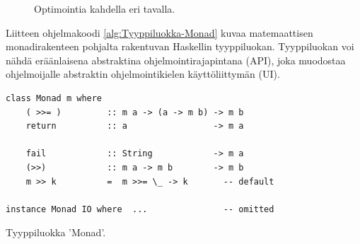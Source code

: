 \begin{figure}[tbh]
\caption{Optimointia kahdella eri tavalla.\label{fig:Optimointia-kahdella-eri}}

\end{figure}




Liitteen ohjelmakoodi \ref{alg:Tyyppiluokka-Monad} kuvaa matemaattisen
monadirakenteen pohjalta rakentuvan Haskellin tyyppiluokan. Tyyppiluokan
voi nähdä eräänlaisena abstraktina ohjelmointirajapintana (API),
joka muodostaa ohjelmoijalle abstraktin ohjelmointikielen käyttöliittymän
(UI).

\begin{algorithm}[tbh]
\begin{verbatim}
class Monad m where
    ( >>= )         :: m a -> (a -> m b) -> m b
    return          :: a                 -> m a

    fail            :: String            -> m a
    (>>)            :: m a -> m b        -> m b
    m >> k          =  m >>= \_ -> k       -- default

instance Monad IO where  ...               -- omitted
\end{verbatim}

\caption{Tyyppiluokka 'Monad'.\label{alg:Tyyppiluokka-Monad}}
\end{algorithm}

